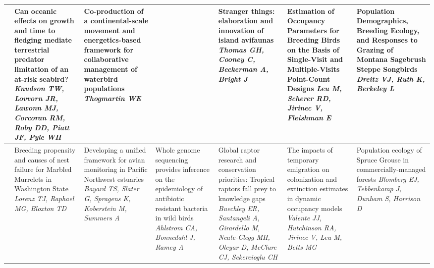 \begin{tabular}{|x{0.75cm}|a{2.25cm}|a{2.25cm}|a{2.25cm}|a{2.25cm}|a{2.25cm}|x{2.25cm}|}
&Can oceanic effects on growth and time to fledging mediate terrestrial predator limitation of an at-risk seabird? \newline \newline \textit{Knudson TW, Lovvorn JR, Lawonn MJ, Corcoran RM, Roby DD, Piatt JF, Pyle WH} & Co-production of a continental-scale movement and energetics-based framework for collaborative management of waterbird populations \newline \newline \textit{Thogmartin WE} &  \newline \newline \textit{} & Stranger things: elaboration and innovation of island avifaunas \newline \newline \textit{Thomas GH, Cooney C, Beckerman A, Bright J} & Estimation of Occupancy Parameters for Breeding Birds on the Basis of Single-Visit and Multiple-Visits Point-Count Designs \newline \newline \textit{Leu M, Scherer RD, Jirinec V, Fleishman E} & Population Demographics, Breeding Ecology, and Responses to Grazing of Montana Sagebrush Steppe Songbirds \newline \newline \textit{Dreitz VJ, Ruth K, Berkeley L}\\
\hline
{}&Breeding propensity and causes of nest failure for Marbled Murrelets in Washington State \newline \newline \textit{Lorenz TJ, Raphael MG, Bloxton TD} & Developing a unified framework for avian monitoring in Pacific Northwest estuaries \newline \newline \textit{Bayard TS, Slater G, Spragens K, Koberstein M, Summers A} & Whole genome sequencing provides inference on the epidemiology of antibiotic resistant bacteria in wild birds \newline \newline \textit{Ahlstrom CA, Bonnedahl J, Ramey A} & Global raptor research and conservation priorities: Tropical raptors fall prey to knowledge gaps \newline \newline \textit{Buechley ER, Santangeli A, Girardello M, Neate‐Clegg MH, Oleyar D, McClure CJ, Sekercioglu CH} & The impacts of temporary emigration on colonization and extinction estimates in dynamic occupancy models \newline \newline \textit{Valente JJ, Hutchinson RA, Jirinec V, Leu M, Betts MG} & Population ecology of Spruce Grouse in commercially-managed forests \newline \newline \textit{Blomberg EJ, Tebbenkamp J, Dunham S, Harrison D}\\

\end{tabular}
